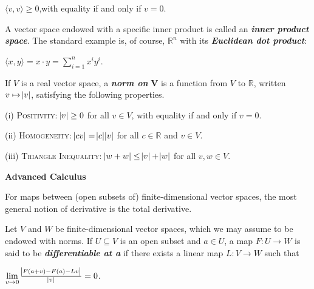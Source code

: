 \documentclass[12pt, a4paper]{article}
\begin{document}
\vspace{4mm}
\centerline{$\langle v, v\rangle\geq 0$,\hspace{5mm}with equality if and only if $v=0$.}

\vspace{4mm}

A vector space endowed with a specific inner product is called an \textit{\textbf{inner product space}}. The standard example is, of course, $\mathbb{R}^n$ with its \textit{\textbf{Euclidean dot product}}:\par

\vspace{4mm}

\centerline{$\langle x, y\rangle= x\cdot y=\sum\limits_{i=1}^{n}x^iy^i$.}

\vspace{4mm}

If $V$ is a real vector space, a \textit{\textbf{norm on}} $\bm{V}$ is a function from $V$ to $\mathbb{R}$, written $v\mapsto\abs{v}$, satisfying the following properties.

\newpage

(i) \textsc{Positivity}: $\abs{v}\geq 0$ for all $v\in V$, with equality if and only if $v=0$.\par
(ii) \textsc{Homogeneity}: $\abs{cv}=\abs{c}\abs{v}$ for all $c\in\mathbb{R}$ and $v\in V$.\par
(iii) \textsc{Triangle Inequality}: $\abs{w+w}\leq \abs{v}+\abs{w}$ for all $v,w\in V$.


\vspace{6mm}

\begin{flushleft}
\textbf{\large{Advanced Calculus}}
\end{flushleft}

For maps between (open subsets of) finite-dimensional vector spaces, the most general notion of derivative is the total derivative.\par

Let $V$ and $W$ be finite-dimensional vector spaces, which we may assume to be endowed with norms. If $U\subseteq V$ is an open subset and $a\in U$, a map $F\colon U\rightarrow W$ is said to be \textit{\textbf{differentiable at a}} if there exists a linear map $L\colon V\rightarrow W$ such that\par

\vspace{4mm}

\centerline{$\lim\limits_{v\to 0}\frac{\abs{F(a+v)-F(a)-Lv}}{\abs{v}}=0$.}
\end{document}
